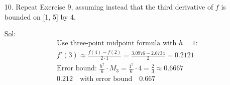 \begin{enumerate}
\item[10.] Repeat Exercise 9, assuming instead that the third derivative of \(f\) is bounded on [1, 5] by 4. 

  \underline{Sol}:\\

  \[
\begin{aligned}
  & \text{Use three-point midpoint formula with } h=1: \\
  & f'(3) \approx \frac{f(4) - f(2)}{2 \cdot 1} = \frac{3.0976 - 2.6734}{2} = 0.2121 \\
  & \text{Error bound: } \frac{h^2}{6} \cdot M_3 = \frac{1^2}{6} \cdot 4 = \frac{2}{3} \approx 0.6667 \\
  & \boxed{0.212} \quad \text{with error bound} \quad \boxed{0.667}
\end{aligned}
\]

\end{enumerate}
